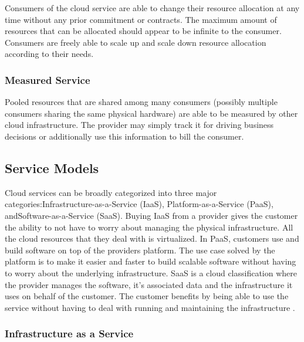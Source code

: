 \documentclass[fullapage,12pt]{article}
\begin{document}
Consumers of the cloud service are able to change their resource allocation at any time without any prior commitment or contracts. The maximum amount of resources that can be allocated should appear to be infinite to the consumer. Consumers are freely able to scale up and scale down resource allocation according to their needs.


\subsubsection{Measured Service} \label{ssub:measured-service}

Pooled resources that are shared among many consumers (possibly multiple consumers sharing the same physical hardware) are able to be measured by other cloud infrastructure. The provider may simply track it for driving business decisions or additionally use this information to bill the consumer.



\subsection{Service Models} \label{sub:servicemodels}

Cloud services can be broadly categorized into three major categories:\linebreak Infrastructure-as-a-Service (IaaS), Platform-as-a-Service (PaaS), and\linebreak Software-as-a-Service (SaaS). Buying IaaS from a provider gives the customer the ability to not have to worry about managing the physical infrastructure. All the cloud resources that they deal with is virtualized. In PaaS, customers use and build software on top of the providers platform. The use case solved by the platform is to make it easier and faster to build scalable software without having to worry about the underlying infrastructure. SaaS is a cloud classification where the provider manages the software, it's associated data and the infrastructure it uses on behalf of the customer. The customer benefits by being able to use the service without having to deal with running and maintaining the infrastructure \cite{Manvi2014}.

\subsubsection{Infrastructure as a Service} \label{ssub:iaas}
\end{document}
